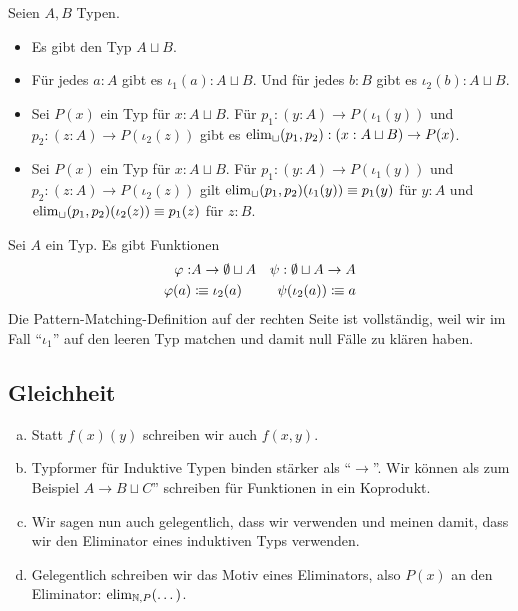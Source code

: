 \begin{regeln}
Seien $A,B$ Typen.
\begin{itemize}
\item Es gibt den Typ $A\sqcup B$.
\item Für jedes $a:A$ gibt es $\iota_1(a):A\sqcup B$.
  Und für jedes $b:B$ gibt es $\iota_2(b):A\sqcup B$.
\item Sei $P(x)$ ein Typ für $x:A\sqcup B$.
  Für $p_1:(y:A)\to P(\iota_1(y))$ und $p_2:(z:A)\to P(\iota_2(z))$
  gibt es $\mathrm{elim}_\sqcup(p_1,p_2):(x:A\sqcup B)\to P(x)$.
\item Sei $P(x)$ ein Typ für $x:A\sqcup B$.
  Für $p_1:(y:A)\to P(\iota_1(y))$ und $p_2:(z:A)\to P(\iota_2(z))$
  gilt $\mathrm{elim}_\sqcup(p_1,p_2)(\iota_1(y))\equiv p_1(y)$ für $y:A$
  und  $\mathrm{elim}_\sqcup(p_1,p_2)(\iota_2(z))\equiv p_1(z)$ für $z:B$.
\end{itemize}
\end{regeln}

\begin{bemerkung}
Sei $A$ ein Typ. Es gibt Funktionen
  \begin{align*}
    \varphi: &A\to \emptyset\sqcup A &\psi:\emptyset\sqcup A \to A \\
    \varphi(a)&\vcentcolon\mspace{-1.2mu}\equiv \iota_2(a) &\psi(\iota_2(a))\vcentcolon\mspace{-1.2mu}\equiv a 
\end{align*}
Die Pattern-Matching-Definition auf der rechten Seite ist vollständig, weil wir im Fall ``$\iota_1$'' auf den leeren Typ matchen und damit null Fälle zu klären haben.
\end{bemerkung}

\subsection{Gleichheit}
\begin{konvention}
\begin{enumerate}[(a)]
\item Statt $f(x)(y)$ schreiben wir auch $f(x,y)$.
\item Typformer für Induktive Typen binden stärker als ``$\to$''. Wir können als zum Beispiel $A\to B\sqcup C$'' schreiben für Funktionen in ein Koprodukt.
\item Wir sagen nun auch gelegentlich, dass wir  verwenden und meinen damit, dass wir den Eliminator eines induktiven Typs verwenden.
\item Gelegentlich schreiben wir das Motiv eines Eliminators, also $P(x)$ an den Eliminator: $\mathrm{elim}_{\mathbb{N},P}(\dots)$.
\end{enumerate}
\end{konvention}

